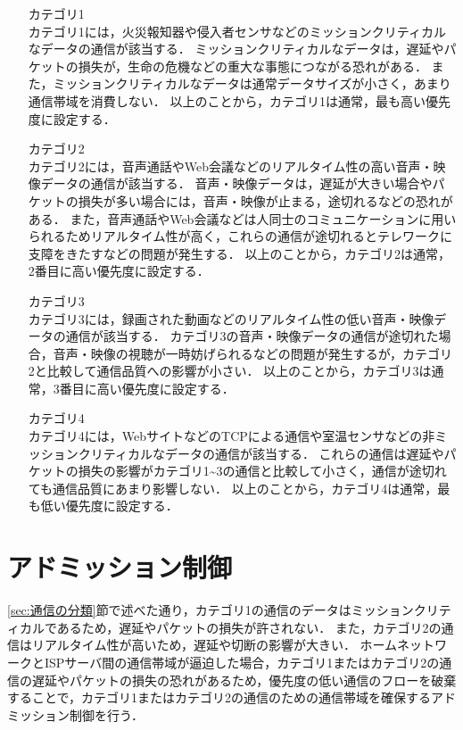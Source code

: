 \documentclass[a4paper,11pt,uplatex]{ujreport}
\begin{document}
  \begin{itemize}
    \setlength{\leftskip}{1.0cm}
    \item[カテゴリ1]\mbox{}\\
          カテゴリ1には，火災報知器や侵入者センサなどのミッションクリティカルなデータの通信が該当する．
          ミッションクリティカルなデータは，遅延やパケットの損失が，生命の危機などの重大な事態につながる恐れがある．
          また，ミッションクリティカルなデータは通常データサイズが小さく，あまり通信帯域を消費しない．
          以上のことから，カテゴリ1は通常，最も高い優先度に設定する．
    \item[カテゴリ2]\mbox{}\\
          カテゴリ2には，音声通話やWeb会議などのリアルタイム性の高い音声・映像データの通信が該当する．
          音声・映像データは，遅延が大きい場合やパケットの損失が多い場合には，音声・映像が止まる，途切れるなどの恐れがある．
          また，音声通話やWeb会議などは人同士のコミュニケーションに用いられるためリアルタイム性が高く，これらの通信が途切れるとテレワークに支障をきたすなどの問題が発生する．
          以上のことから，カテゴリ2は通常，2番目に高い優先度に設定する．
    \item[カテゴリ3]\mbox{}\\
          カテゴリ3には，録画された動画などのリアルタイム性の低い音声・映像データの通信が該当する．
          カテゴリ3の音声・映像データの通信が途切れた場合，音声・映像の視聴が一時妨げられるなどの問題が発生するが，カテゴリ2と比較して通信品質への影響が小さい．
          以上のことから，カテゴリ3は通常，3番目に高い優先度に設定する．
    \item[カテゴリ4]\mbox{}\\   
          カテゴリ4には，WebサイトなどのTCPによる通信や室温センサなどの非ミッションクリティカルなデータの通信が該当する．
          これらの通信は遅延やパケットの損失の影響がカテゴリ1\textasciitilde3の通信と比較して小さく，通信が途切れても通信品質にあまり影響しない．
          以上のことから，カテゴリ4は通常，最も低い優先度に設定する．

  \end{itemize}

\section{アドミッション制御}
\label{sec:アドミッション制御}

  \ref{sec:通信の分類}節で述べた通り，カテゴリ1の通信のデータはミッションクリティカルであるため，遅延やパケットの損失が許されない．
  また，カテゴリ2の通信はリアルタイム性が高いため，遅延や切断の影響が大きい．
  ホームネットワークとISPサーバ間の通信帯域が逼迫した場合，カテゴリ1またはカテゴリ2の通信の遅延やパケットの損失の恐れがあるため，優先度の低い通信のフローを破棄することで，カテゴリ1またはカテゴリ2の通信のための通信帯域を確保するアドミッション制御を行う．\par
\end{document}

